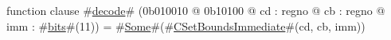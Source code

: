 function clause #\hyperref[zdecode]{decode}# (0b010010 @ 0b10100 @ cd : regno @ cb : regno @ imm : #\hyperref[zbits]{bits}#(11)) = #\hyperref[zSome]{Some}#(#\hyperref[zCSetBoundsImmediate]{CSetBoundsImmediate}#(cd, cb, imm))
